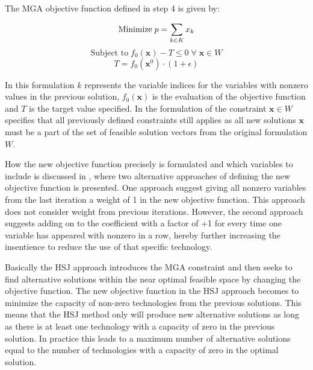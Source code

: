 The MGA objective function defined in step 4 is given by:

\begin{equation}\label{eq:HSJ_objective}
\text{Minimize} \;  p = \sum_{k \in K} x_k \\
\end{equation}
\begin{equation}\label{eq:MGA_constraint}
\text{Subject to} \;  f_0(\mathbf{x}) - T \leq 0 \; \forall \;  \mathbf{x}\in W
\end{equation}
\begin{equation}\label{eq:target_value}
T =  f_0(\mathbf{x}^0) \cdot (1+\epsilon)
\end{equation}

In this formulation $k$ represents the variable indices for the variables with nonzero values in the previous solution, $f_0(\mathbf{x})$ is the evaluation of the objective function and $T$ is the target value specified. In the formulation of the constraint $\mathbf{x}\in W$ specifies that all previously defined constraints still applies as all new solutions $\mathbf{x}$ must be a part of the set of feasible solution vectors from the original formulation $W$.

How the new objective function precisely is formulated and which variables to include is discussed in \cite{DECAROLIS2016}, where two alternative approaches of defining the new objective function is presented. One approach suggest giving all nonzero variables from the last iteration a weight of 1 in the new objective function. This approach does not consider weight from previous iterations. However, the second approach suggests adding on to the coefficient with a factor of +1 for every time one variable has appeared with nonzero in a row, hereby further increasing the insentience to reduce the use of that specific technology. 

Basically the HSJ approach introduces the MGA constraint and then seeks to find alternative solutions within the near optimal feasible space by changing the objective function. The new objective function in the HSJ approach becomes to minimize the capacity of non-zero technologies from the previous solutions. This means that the HSJ method only will produce new alternative solutions as long as there is at least one technology with a capacity of zero in the previous solution. In practice this leads to a maximum number of alternative solutions equal to the number of technologies with a capacity of zero in the optimal solution. 

